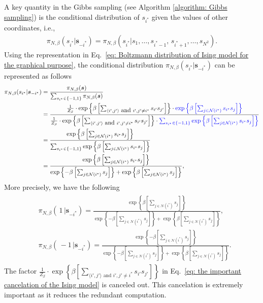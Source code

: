\documentclass[11pt,letterpaper, leqno]{article}
\numberwithin{equation}{section}
\numberwithin{theorem}{section}
\numberwithin{lemma}{section}
\numberwithin{corollary}{section}
\numberwithin{definition}{section}
\numberwithin{proposition}{section}
\numberwithin{remark}{section}
\numberwithin{example}{section}
\begin{document}
A key quantity in the Gibbs sampling (see Algorithm \ref{algorithm: Gibbs sampling}) is the conditional distribution of $s_{i^*}$ given the values of other coordinates, i.e.,
\begin{align*}
    \pi_{N,\beta}(s_{i^*}\vert\boldsymbol{s}_{-i^*})= \pi_{N,\beta}(s_{i^*}\vert s_1,\ldots,s_{i^*-1},\, s_{i^*+1},\ldots,s_{N^2}).
\end{align*}
Using the representation in Eq.~\eqref{eq: Boltzmann distribution of Ising model for the graphical purpose}, the conditional distribution $\pi_{N,\beta}(s_{i^*}\vert\boldsymbol{s}_{-i^*})$ can be represented as follows
\begin{align}\label{eq: the important cancelation of the Ising model}
    \begin{aligned}
    \pi_{N,\beta}(s_{i^*}\vert\boldsymbol{s}_{-i^*}) &= \frac{\pi_{N,\beta}(\boldsymbol{s})}{\sum_{s_{i^*}\in\{-1,1\}}\pi_{N,\beta}(\boldsymbol{s})} \\
    &= \frac{\frac{1}{Z_\beta}\cdot\exp\left\{\beta\left[\sum_{\langle i',j'\rangle\mbox{ and }i',j'\ne i^*}s_{i'}s_{j'}\right]\right\}\cdot \textcolor{blue}{\exp\left\{\beta\left[\sum_{j\in\mathcal{N}(i^*)}s_{i^*}s_j\right]\right\}}}{\frac{1}{Z_\beta}\cdot\exp\left\{\beta\left[\sum_{\langle i',j'\rangle\mbox{ and }i',j'\ne i^*}s_{i'}s_{j'}\right]\right\}\cdot \textcolor{blue}{\sum_{s_{i^*}\in\{-1,1\}}\exp\left\{\beta\left[\sum_{j\in\mathcal{N}(i^*)}s_{i^*}s_j\right]\right\}}} \\
    &= \frac{\exp\left\{\beta\left[\sum_{j\in\mathcal{N}(i^*)}s_{i^*}s_j\right]\right\}}{\sum_{s_{i^*}\in\{-1,1\}}\exp\left\{\beta\left[\sum_{j\in\mathcal{N}(i^*)}s_{i^*}s_j\right]\right\}} \\
    &= \frac{\exp\left\{\beta\left[\sum_{j\in\mathcal{N}(i^*)}s_{i^*}s_j\right]\right\}}{\exp\left\{-\beta\left[\sum_{j\in\mathcal{N}(i^*)} s_j\right]\right\} + \exp\left\{\beta\left[\sum_{j\in\mathcal{N}(i^*)} s_j\right]\right\}},
    \end{aligned}
\end{align}
More precisely, we have the following
\begin{align}\label{eq: conditional distribition}
    \begin{aligned}
        & \pi_{N,\beta}(\, 1 \, \vert\boldsymbol{s}_{-i^*}) = \frac{\exp\left\{\beta\left[\sum_{j\in\mathcal{N}(i^*)} s_j\right]\right\}}{\exp\left\{-\beta\left[\sum_{j\in\mathcal{N}(i^*)} s_j\right]\right\} + \exp\left\{\beta\left[\sum_{j\in\mathcal{N}(i^*)} s_j\right]\right\}}, \\
    & \pi_{N,\beta}( \, -1 \, \vert\boldsymbol{s}_{-i^*}) = \frac{\exp\left\{-\beta\left[\sum_{j\in\mathcal{N}(i^*)} s_j\right]\right\}}{\exp\left\{-\beta\left[\sum_{j\in\mathcal{N}(i^*)} s_j\right]\right\} + \exp\left\{\beta\left[\sum_{j\in\mathcal{N}(i^*)} s_j\right]\right\}}.
    \end{aligned}
\end{align}
The factor $\frac{1}{Z_\beta}\cdot\exp\left\{\beta\left[\sum_{\langle i',j'\rangle\mbox{ and }i',j'\ne i^*}s_{i'}s_{j'}\right]\right\}$ in Eq.~\eqref{eq: the important cancelation of the Ising model} is canceled out. This cancelation is extremely important as it reduces the redundant computation.
\end{document}
